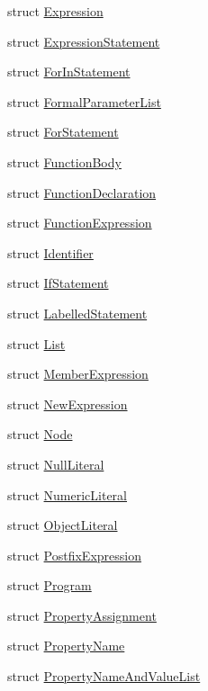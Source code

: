 \begin{DoxyCompactItemize}
\item 
struct \hyperlink{structast_1_1_expression}{Expression}
\item 
struct \hyperlink{structast_1_1_expression_statement}{Expression\+Statement}
\item 
struct \hyperlink{structast_1_1_for_in_statement}{For\+In\+Statement}
\item 
struct \hyperlink{structast_1_1_formal_parameter_list}{Formal\+Parameter\+List}
\item 
struct \hyperlink{structast_1_1_for_statement}{For\+Statement}
\item 
struct \hyperlink{structast_1_1_function_body}{Function\+Body}
\item 
struct \hyperlink{structast_1_1_function_declaration}{Function\+Declaration}
\item 
struct \hyperlink{structast_1_1_function_expression}{Function\+Expression}
\item 
struct \hyperlink{structast_1_1_identifier}{Identifier}
\item 
struct \hyperlink{structast_1_1_if_statement}{If\+Statement}
\item 
struct \hyperlink{structast_1_1_labelled_statement}{Labelled\+Statement}
\item 
struct \hyperlink{structast_1_1_list}{List}
\item 
struct \hyperlink{structast_1_1_member_expression}{Member\+Expression}
\item 
struct \hyperlink{structast_1_1_new_expression}{New\+Expression}
\item 
struct \hyperlink{structast_1_1_node}{Node}
\item 
struct \hyperlink{structast_1_1_null_literal}{Null\+Literal}
\item 
struct \hyperlink{structast_1_1_numeric_literal}{Numeric\+Literal}
\item 
struct \hyperlink{structast_1_1_object_literal}{Object\+Literal}
\item 
struct \hyperlink{structast_1_1_postfix_expression}{Postfix\+Expression}
\item 
struct \hyperlink{structast_1_1_program}{Program}
\item 
struct \hyperlink{structast_1_1_property_assignment}{Property\+Assignment}
\item 
struct \hyperlink{structast_1_1_property_name}{Property\+Name}
\item 
struct \hyperlink{structast_1_1_property_name_and_value_list}{Property\+Name\+And\+Value\+List}

\end{DoxyCompactItemize}
